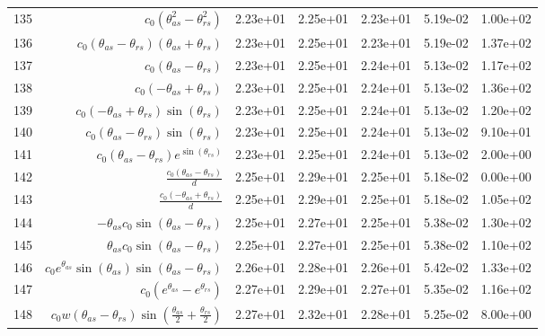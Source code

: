 \begin{tabularx}{\textwidth}{lRRRRRl}
135  &  $ c_{0} \left(\theta_{as}^{2} - \theta_{rs}^{2}\right) $  &  2.23e+01  &  2.25e+01  &  2.23e+01  &  5.19e-02  &  1.00e+02  \\ 
136  &  $ c_{0} \left(\theta_{as} - \theta_{rs}\right) \left(\theta_{as} + \theta_{rs}\right) $  &  2.23e+01  &  2.25e+01  &  2.23e+01  &  5.19e-02  &  1.37e+02  \\ 
137  &  $ c_{0} \left(\theta_{as} - \theta_{rs}\right) $  &  2.23e+01  &  2.25e+01  &  2.24e+01  &  5.13e-02  &  1.17e+02  \\ 
138  &  $ c_{0} \left(- \theta_{as} + \theta_{rs}\right) $  &  2.23e+01  &  2.25e+01  &  2.24e+01  &  5.13e-02  &  1.36e+02  \\ 
139  &  $ c_{0} \left(- \theta_{as} + \theta_{rs}\right) \sin{\left(\theta_{rs} \right)} $  &  2.23e+01  &  2.25e+01  &  2.24e+01  &  5.13e-02  &  1.20e+02  \\ 
140  &  $ c_{0} \left(\theta_{as} - \theta_{rs}\right) \sin{\left(\theta_{rs} \right)} $  &  2.23e+01  &  2.25e+01  &  2.24e+01  &  5.13e-02  &  9.10e+01  \\ 
141  &  $ c_{0} \left(\theta_{as} - \theta_{rs}\right) e^{\sin{\left(\theta_{rs} \right)}} $  &  2.23e+01  &  2.25e+01  &  2.24e+01  &  5.13e-02  &  2.00e+00  \\ 
142  &  $ \displaystyle\frac{c_{0} \left(\theta_{as} - \theta_{rs}\right)}{d} $  &  2.25e+01  &  2.29e+01  &  2.25e+01  &  5.18e-02  &  0.00e+00  \\ 
143  &  $ \displaystyle\frac{c_{0} \left(- \theta_{as} + \theta_{rs}\right)}{d} $  &  2.25e+01  &  2.29e+01  &  2.25e+01  &  5.18e-02  &  1.05e+02  \\ 
144  &  $ - \theta_{as} c_{0} \sin{\left(\theta_{as} - \theta_{rs} \right)} $  &  2.25e+01  &  2.27e+01  &  2.25e+01  &  5.38e-02  &  1.30e+02  \\ 
145  &  $ \theta_{as} c_{0} \sin{\left(\theta_{as} - \theta_{rs} \right)} $  &  2.25e+01  &  2.27e+01  &  2.25e+01  &  5.38e-02  &  1.10e+02  \\ 
146  &  $ c_{0} e^{\theta_{as}} \sin{\left(\theta_{as} \right)} \sin{\left(\theta_{as} - \theta_{rs} \right)} $  &  2.26e+01  &  2.28e+01  &  2.26e+01  &  5.42e-02  &  1.33e+02  \\ 
147  &  $ c_{0} \left(e^{\theta_{as}} - e^{\theta_{rs}}\right) $  &  2.27e+01  &  2.29e+01  &  2.27e+01  &  5.35e-02  &  1.16e+02  \\ 
148  &  $ c_{0} w \left(\theta_{as} - \theta_{rs}\right) \sin{\left(\displaystyle\frac{\theta_{as}}{2} + \displaystyle\frac{\theta_{rs}}{2} \right)} $  &  2.27e+01  &  2.32e+01  &  2.28e+01  &  5.25e-02  &  8.00e+00  \\ 

\end{tabularx}

